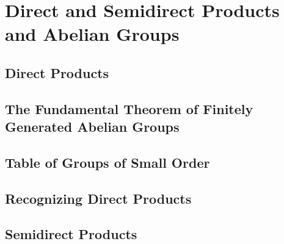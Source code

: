 \chapter{Direct and Semidirect Products and Abelian Groups}

\section{Direct Products}

\section{The Fundamental Theorem of Finitely Generated Abelian Groups}

\section{Table of Groups of Small Order}

\section{Recognizing Direct Products}

\section{Semidirect Products}


